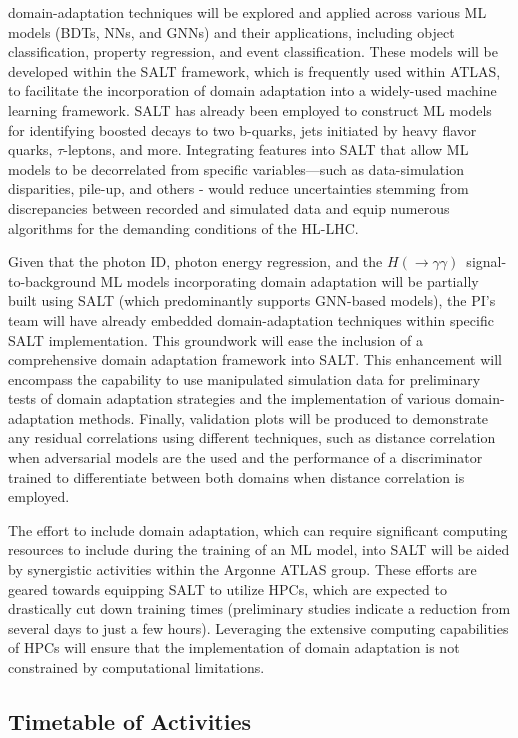 \documentclass[letter, USenglish, 11pt, subfigure]{article}
\newcommand{\hyy}{\ensuremath{H(\to\gamma\gamma)}}
\begin{document}
domain-adaptation techniques will be explored and applied across various ML models (BDTs, NNs, and GNNs) and their applications, including object classification, property regression, and event classification. These models will be developed within the SALT framework, which is frequently used within ATLAS, to facilitate the incorporation of domain adaptation into a widely-used machine learning framework. SALT has already been employed to construct ML models for identifying boosted decays to two b-quarks, jets initiated by heavy flavor quarks, $\tau$-leptons, and more. Integrating features into SALT that allow ML models to be decorrelated from specific variables—such as data-simulation disparities, pile-up, and others - would reduce uncertainties stemming from discrepancies between recorded and simulated data and equip numerous algorithms for the demanding conditions of the HL-LHC.

Given that the photon ID, photon energy regression, and the \hyy\ signal-to-background ML models incorporating domain adaptation will be partially built using SALT (which predominantly supports GNN-based models), the PI's team will have already embedded domain-adaptation techniques within specific SALT implementation. This groundwork will ease the inclusion of a comprehensive domain adaptation framework into SALT. This enhancement will encompass the capability to use manipulated simulation data for preliminary tests of domain adaptation strategies and the implementation of various domain-adaptation methods. Finally, validation plots will be produced to demonstrate any residual correlations using different techniques, such as distance correlation when adversarial models are the used and the performance of a discriminator trained to differentiate between both domains when distance correlation is employed.

The effort to include domain adaptation, which can require significant computing resources to include during the training of an ML model, into SALT will be aided by synergistic activities within the Argonne ATLAS group. These efforts are geared towards equipping SALT to utilize HPCs, which are expected to drastically cut down training times (preliminary studies indicate a reduction from several days to just a few hours). Leveraging the extensive computing capabilities of HPCs will ensure that the implementation of domain adaptation is not constrained by computational limitations.

\subsection{Timetable of Activities}
\label{sec:timetable}
\end{document}
